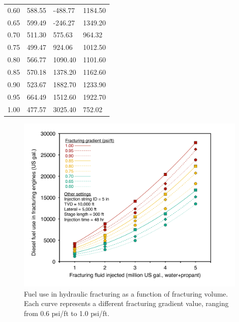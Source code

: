 \documentclass[11pt]{report}
\begin{document}
\begin{table}
\begin{scriptsize}
\tablehead{}
\tabletail{}
\tablelasttail{\bottomrule}
\label{tab:fracturing_fit}
\begin{threeparttable}
\begin{supertabular*}{0.6\columnwidth}{p{0.12\columnwidth}p{0.12\columnwidth}p{0.12\columnwidth}p{0.12\columnwidth}}
0.60 & 588.55 & -488.77 & 1184.50 \\
0.65 & 599.49 & -246.27 & 1349.20 \\
0.70 & 511.30 & 575.63  & 964.32  \\
0.75 & 499.47 & 924.06  & 1012.50 \\
0.80 & 566.77 & 1090.40 & 1101.60 \\
0.85 & 570.18 & 1378.20 & 1162.60 \\
0.90 & 523.67 & 1882.70 & 1233.90 \\
0.95 & 664.49 & 1512.60 & 1922.70 \\
1.00 & 477.57 & 3025.40 & 752.02 \\
\end{supertabular*}
\end{threeparttable}
\end{scriptsize}
\end{table}

\begin{figure}[tb]
\includegraphics[width=0.8\columnwidth]{images/Fracturing1.pdf}
\caption{Fuel use in hydraulic fracturing as a function of fracturing volume. Each curve represents a different fracturing gradient value, ranging from 0.6 psi/ft to 1.0 psi/ft.}
\label{fig:fracturing1}
\end{figure}
\end{document}
